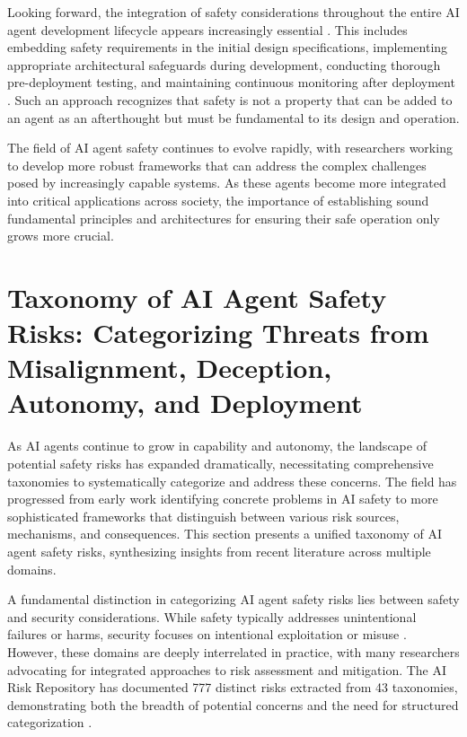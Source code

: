 \documentclass[conference]{IEEEtran}
\begin{document}
Looking forward, the integration of safety considerations throughout the entire AI agent development lifecycle appears increasingly essential \cite{2503.04746}. This includes embedding safety requirements in the initial design specifications, implementing appropriate architectural safeguards during development, conducting thorough pre-deployment testing, and maintaining continuous monitoring after deployment \cite{2408.12935}. Such an approach recognizes that safety is not a property that can be added to an agent as an afterthought but must be fundamental to its design and operation.

The field of AI agent safety continues to evolve rapidly, with researchers working to develop more robust frameworks that can address the complex challenges posed by increasingly capable systems. As these agents become more integrated into critical applications across society, the importance of establishing sound fundamental principles and architectures for ensuring their safe operation only grows more crucial.



\section{Taxonomy of AI Agent Safety Risks: Categorizing Threats from Misalignment, Deception, Autonomy, and Deployment}

As AI agents continue to grow in capability and autonomy, the landscape of potential safety risks has expanded dramatically, necessitating comprehensive taxonomies to systematically categorize and address these concerns. The field has progressed from early work identifying concrete problems in AI safety \cite{2401.10899} to more sophisticated frameworks that distinguish between various risk sources, mechanisms, and consequences. This section presents a unified taxonomy of AI agent safety risks, synthesizing insights from recent literature across multiple domains.

A fundamental distinction in categorizing AI agent safety risks lies between safety and security considerations. While safety typically addresses unintentional failures or harms, security focuses on intentional exploitation or misuse \cite{2405.19524}. However, these domains are deeply interrelated in practice, with many researchers advocating for integrated approaches to risk assessment and mitigation. The AI Risk Repository has documented 777 distinct risks extracted from 43 taxonomies, demonstrating both the breadth of potential concerns and the need for structured categorization \cite{2408.12622}.
\end{document}

